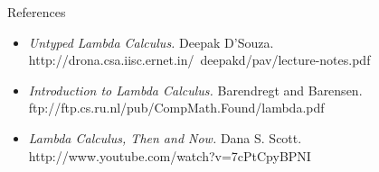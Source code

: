 \documentclass{beamer}
\begin{document}

\begin{frame}{References}
\begin{itemize}
\item \emph{Untyped Lambda Calculus.} Deepak D'Souza. http://drona.csa.iisc.ernet.in/~deepakd/pav/lecture-notes.pdf
\item \emph{Introduction to Lambda Calculus.} Barendregt and Barensen.
ftp://ftp.cs.ru.nl/pub/CompMath.Found/lambda.pdf
\item \emph{Lambda Calculus, Then and Now.} Dana S. Scott. http://www.youtube.com/watch?v=7cPtCpyBPNI
\end{itemize}
\end{frame}
\end{document}
